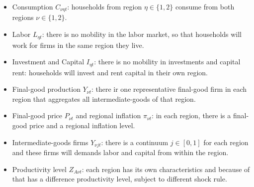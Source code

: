 \documentclass[
thesis.tex
]{subfiles}
\begin{document}
\begin{itemize}
	\item Consumption \(C_{\nu\eta t}\): households from region $\eta \in \{1,2\}$ consume from both regions $\nu \in \{1,2\}$.
	
	\item Labor \(L_{\eta t}\): there is no mobility in the labor market, so that households will work for firms in the same region they live.
	
	\item Investment and Capital \(I_{\eta t}\): there is no mobility in investments and capital rent: households will invest and rent capital in their own region.
	
	\item Final-good production \(Y_{\nu t}\): there ir one representative final-good firm in each region that aggregates all intermediate-goods of that region.
	
	\item Final-good price \(P_{\nu t}\) and regional inflation \(\pi_{\nu t}\): in each region, there is a final-good price and a regional inflation level.
	
	\item Intermediate-goods firms \(Y_{\nu jt}\): there is a continuum $j \in [0,1]$ for each region and these firms will demands labor and capital from within the region.
	
	\item Productivity level \(Z_{A\nu t}\): each region has its own characteristics and because of that has a difference productivity level, subject to different shock rule.
	
	\begin{comment}
		
		Determining whether the variable (or parameter) should be region-specific (or not) requires justification:
		
		\item Consumption \(C_{\nu\eta t}\) and \(I_{it}\): Consumption from region to region should vary based on the abundance of natural resources and the available technology in that region: each region will specialize in producing goods that are resource-intensive, considering the resources that are abundant in that specific region. This will increase the supply, decreasing their relative price and making them more demanded. Investment is decided based on the household maximization problem, in which consumption level must be decided regionally.
		
		\item \(\sigma_i\): Consumer preference should be somehow tied to cultural aspects, such as food choices (coastal regions will have a higher emphasis on seafood) or climate characteristics (warmer regions require air conditioning, while colder regions need heaters).
		

\end{comment}
\end{itemize}
\end{document}
